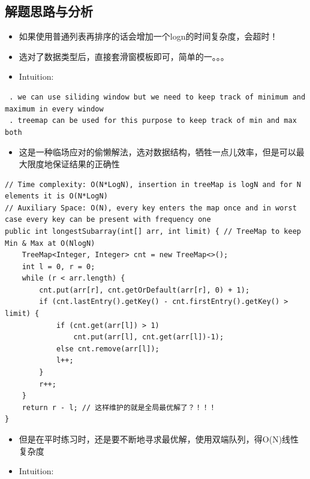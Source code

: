 \documentclass[9pt, b5paaper]{book}
\begin{document}
\subsection{解题思路与分析}
\label{sec-12-6-1}
\begin{itemize}
\item 如果使用普通列表再排序的话会增加一个logn的时间复杂度，会超时！
\item 选对了数据类型后，直接套滑窗模板即可，简单的一。。。
\item Intuition:
\end{itemize}
\begin{verbatim}
 . we can use siliding window but we need to keep track of minimum and maximum in every window 
 . treemap can be used for this purpose to keep track of min and max both
\end{verbatim}
\begin{itemize}
\item 这是一种临场应对的偷懒解法，选对数据结构，牺牲一点儿效率，但是可以最大限度地保证结果的正确性
\end{itemize}
\begin{verbatim}
// Time complexity: O(N*LogN), insertion in treeMap is logN and for N elements it is O(N*LogN)
// Auxiliary Space: O(N), every key enters the map once and in worst case every key can be present with frequency one
public int longestSubarray(int[] arr, int limit) { // TreeMap to keep Min & Max at O(NlogN)
    TreeMap<Integer, Integer> cnt = new TreeMap<>();
    int l = 0, r = 0;
    while (r < arr.length) {
        cnt.put(arr[r], cnt.getOrDefault(arr[r], 0) + 1);
        if (cnt.lastEntry().getKey() - cnt.firstEntry().getKey() > limit) {
            if (cnt.get(arr[l]) > 1)
                cnt.put(arr[l], cnt.get(arr[l])-1);
            else cnt.remove(arr[l]);
            l++;
        }
        r++;
    }
    return r - l; // 这样维护的就是全局最优解了？！！！
}
\end{verbatim}
\begin{itemize}
\item 但是在平时练习时，还是要不断地寻求最优解，使用双端队列，得O(N)线性复杂度
\item Intuition:
\end{itemize}
\end{document}
